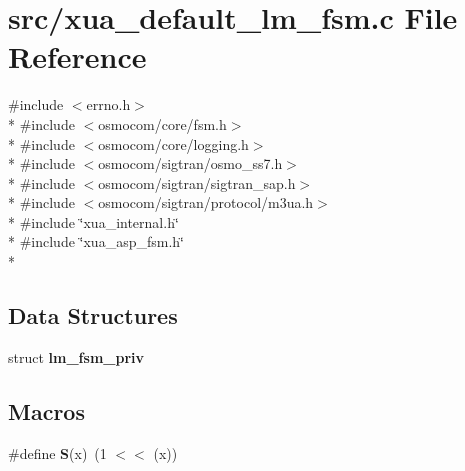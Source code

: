 \section{src/xua\+\_\+default\+\_\+lm\+\_\+fsm.c File Reference}
\label{xua__default__lm__fsm_8c}
{\ttfamily \#include $<$errno.\+h$>$}\\*
{\ttfamily \#include $<$osmocom/core/fsm.\+h$>$}\\*
{\ttfamily \#include $<$osmocom/core/logging.\+h$>$}\\*
{\ttfamily \#include $<$osmocom/sigtran/osmo\+\_\+ss7.\+h$>$}\\*
{\ttfamily \#include $<$osmocom/sigtran/sigtran\+\_\+sap.\+h$>$}\\*
{\ttfamily \#include $<$osmocom/sigtran/protocol/m3ua.\+h$>$}\\*
{\ttfamily \#include \char`\"{}xua\+\_\+internal.\+h\char`\"{}}\\*
{\ttfamily \#include \char`\"{}xua\+\_\+asp\+\_\+fsm.\+h\char`\"{}}\\*
\subsection*{Data Structures}
\begin{DoxyCompactItemize}
\item 
struct {\bf lm\+\_\+fsm\+\_\+priv}
\end{DoxyCompactItemize}
\subsection*{Macros}
\begin{DoxyCompactItemize}
\item 
\#define {\bf S}(x)~(1 $<$$<$ (x))
\end{DoxyCompactItemize}
